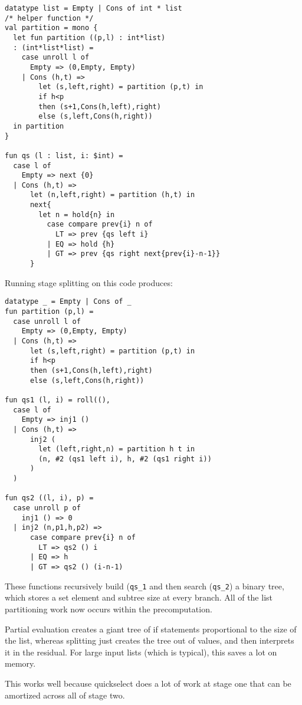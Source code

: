 \begin{lstlisting} 
datatype list = Empty | Cons of int * list
/* helper function */
val partition = mono {
  let fun partition ((p,l) : int*list) 
  : (int*list*list) =
    case unroll l of 
      Empty => (0,Empty, Empty) 
    | Cons (h,t) =>
        let (s,left,right) = partition (p,t) in
        if h<p 
        then (s+1,Cons(h,left),right)
        else (s,left,Cons(h,right))
  in partition
}

fun qs (l : list, i: $int) = 
  case l of
    Empty => next {0}
  | Cons (h,t) => 
      let (n,left,right) = partition (h,t) in
      next{
        let n = hold{n} in
          case compare prev{i} n of
            LT => prev {qs left i}
          | EQ => hold {h}
          | GT => prev {qs right next{prev{i}-n-1}}
      }	
\end{lstlisting}

\noindent
Running stage splitting on this code produces:

\begin{lstlisting} 
datatype _ = Empty | Cons of _
fun partition (p,l) =
  case unroll l of 
    Empty => (0,Empty, Empty) 
  | Cons (h,t) =>
      let (s,left,right) = partition (p,t) in
      if h<p 
      then (s+1,Cons(h,left),right)
      else (s,left,Cons(h,right))

fun qs1 (l, i) = roll((), 
  case l of
    Empty => inj1 ()
  | Cons (h,t) => 
      inj2 (
        let (left,right,n) = partition h t in
        (n, #2 (qs1 left i), h, #2 (qs1 right i))
      )
  )

fun qs2 ((l, i), p) = 
  case unroll p of
    inj1 () => 0
  | inj2 (n,p1,h,p2) => 
      case compare prev{i} n of
        LT => qs2 () i
      | EQ => h
      | GT => qs2 () (i-n-1)
\end{lstlisting}

These functions recursively build ({\tt qs\_1} and then search ({\tt qs\_2}) a binary tree,
which stores a set element and subtree size at every branch.
All of the list partitioning work now occurs within the precomputation.

Partial evaluation creates a giant tree of if statements proportional to the size of the list,
whereas splitting just creates the tree out of values, and then interprets it in the residual.
For large input lists (which is typical), this saves a lot on memory.

This works well because quickselect does a lot of work at stage one that can be amortized across all of stage two.


